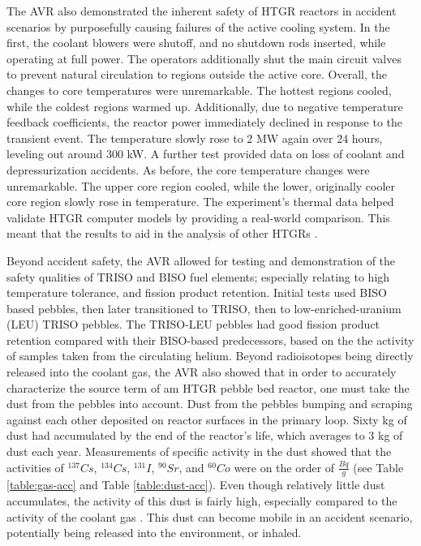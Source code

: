The AVR also demonstrated the inherent safety of HTGR reactors in accident scenarios by purposefully causing failures of the active cooling system.  In the first, the coolant blowers were shutoff, and no shutdown rods inserted, while operating at full power.  The operators additionally shut the main circuit valves to prevent natural circulation to regions outside the active core.  Overall, the changes to core temperatures were unremarkable.  The hottest regions cooled, while the coldest regions warmed up.  Additionally, due to negative temperature feedback coefficients, the reactor power immediately declined in response to the transient event.  The temperature slowly rose to 2 MW again over 24 hours, leveling out around 300 kW.  A further test provided data on loss of coolant and depressurization accidents.  As before, the core temperature changes were unremarkable.  The upper core region cooled, while the lower, originally cooler core region slowly rose in temperature.  The experiment's thermal data helped validate HTGR computer models by providing a real-world comparison.  This meant that the results to aid in the analysis of other HTGRs \cite{noauthor_results_1990}.

Beyond accident safety, the AVR allowed for testing and demonstration of the safety qualities of TRISO and BISO fuel elements; especially relating to high temperature tolerance, and fission product retention.  Initial tests used BISO based pebbles, then later transitioned to TRISO, then to low-enriched-uranium (LEU) TRISO pebbles.  The TRISO-LEU pebbles had good fission product retention compared with their BISO-based predecessors, based on the the activity of samples taken from the circulating helium.  Beyond radioisotopes being directly released into the coolant gas, the AVR also showed that in order to accurately characterize the source term of am HTGR pebble bed reactor, one must take the dust from the pebbles into account.  Dust from the pebbles bumping and scraping against each other deposited on reactor surfaces in the primary loop.  Sixty kg of dust had accumulated by the end of the reactor's life, which averages to 3 kg of dust each year.  Measurements of specific activity in the dust showed that the activities of $^{137}Cs$, $^{134}Cs$, $^{131}I$, $^{90}Sr$, and $^{60}Co$ were on the order of $\frac{Bq}{g}$ (see Table \ref{table:gas-acc} and Table \ref{table:dust-acc}).  Even though relatively little dust accumulates, the activity of this dust is fairly high, especially compared to the activity of the coolant gas \cite{noauthor_results_1990}.  This dust can become mobile in an accident scenario, potentially being released into the environment, or inhaled.

